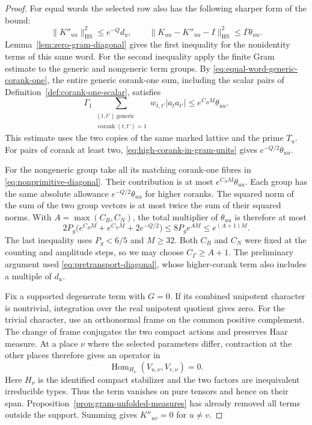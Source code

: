 \begin{proof}

For equal words the selected row also has the following sharper
form of the bound:
\begin{equation}\label{eq:selected-diag-split}
 \|K''_{uu}\|_{\mathrm{HS}}^2\le e^{-Q}d_u,\qquad
 \|K_{uu}-K''_{uu}-I\|_{\mathrm{HS}}^2
                         \le \Gamma\theta_{uu}.
\end{equation}
Lemma~\ref{lem:zero-gram-diagonal} gives the first inequality for the nonidentity terms of this same word. For the second inequality apply the finite
Gram estimate to the generic and nongeneric term groups. By
\eqref{eq:equal-word-generic-corank-one}, the entire generic
corank-one sum, including the scalar pairs of
Definition~\ref{def:corank-one-scalar}, satisfies
\[
 \Gamma_1\sum_{\substack{(t,t')\ \mathrm{generic}\\\operatorname{corank}(t,t')=1}}w_{t,t'}|a_t a_{t'}|
       \le e^{C_BM}\theta_{uu}.
\]
This estimate uses the two
copies of the same marked lattice and the prime \(T_u\).
For pairs of corank at least two,
\eqref{eq:high-corank-in-gram-units} gives \(e^{-Q/2}\theta_{uu}\).

For the nongeneric group take all its matching corank-one fibres
in \eqref{eq:nonprimitive-diagonal}. Their contribution is at most
\(e^{C_NM}\theta_{uu}\). Each group has the same absolute allowance
\(e^{-Q/2}\theta_{uu}\) for higher coranks. The squared norm of
the sum of the two group vectors is at most twice the sum of their
squared norms. With \(A=\max(C_B,C_N)\), the total multiplier of
\(\theta_{uu}\) is therefore at most
\[
  2P_g\bigl(e^{C_BM}+e^{C_NM}+2e^{-Q/2}\bigr)
     \le 8P_g e^{AM}\le e^{(A+1)M}.
\]
The last inequality uses \(P_g<6/5\) and \(M\ge32\). Both
\(C_B\) and \(C_N\) were fixed at the counting and amplitude
steps, so we may choose \(C_\Gamma\ge A+1\).
The preliminary argument used
\eqref{eq:pretransport-diagonal}, whose higher-corank term
also includes a multiple of \(d_u\). \label{cor:selected-row-gram-5}


Fix a supported degenerate term with \(G=0\). If its combined
unipotent character is nontrivial, integration over the real
unipotent quotient gives zero. For the trivial character, use an
orthonormal frame on the common positive complement. The change of
frame conjugates the two compact actions and preserves Haar measure.
At a place \(\nu\) where the selected parameters differ, contraction
at the other places therefore gives an operator in
\[
 \operatorname{Hom}_{H_\nu}(V_{u,\nu},V_{v,\nu})=0 .
\]
Here \(H_\nu\) is the identified compact stabilizer and the two factors
are inequivalent irreducible types. Thus the term vanishes on pure
tensors and hence on their span. Proposition~\ref{prop:gram-unfolded-measures}
has already removed all terms outside the support. Summing gives
\(K''_{uv}=0\) for \(u\ne v\).


\end{proof}
